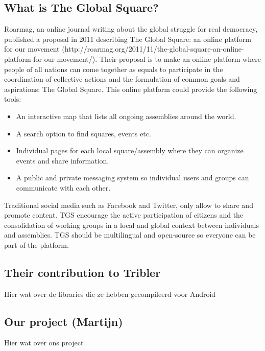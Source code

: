 \documentclass[11pt]{article}
\begin{document}
\subsection{What is The Global Square?}
Roarmag, an online journal writing about the global struggle for real democracy, published a proposal in 2011 describing The Global Square: an online platform for our movement (http://roarmag.org/2011/11/the-global-square-an-online-platform-for-our-movement/). Their proposal is to make an online platform where people of all nations can come together as equals to participate in the coordination of collective actions and the formulation of common goals and aspirations: The Global Square. This online platform could provide the following tools:
\begin{itemize}
\item An interactive map that lists all ongoing assemblies around the world.
\item A search option to find squares, events etc.
\item Individual pages for each local square/assembly where they can organize events and share information.
\item A public and private messaging system so individual users and groups can communicate with each other.
\end{itemize}
Traditional social media such as Facebook and Twitter, only allow to share and promote content. TGS encourage the active participation of citizens and the consolidation of working groups in a local and global context between individuals and assemblies. TGS should be multilingual and open-source so everyone can be part of the platform.

\subsection{Their contribution to Tribler}
Hier wat over de libraries die ze hebben gecompileerd voor Android

\subsection{Our project (Martijn)}
Hier wat over ons project
\end{document}
